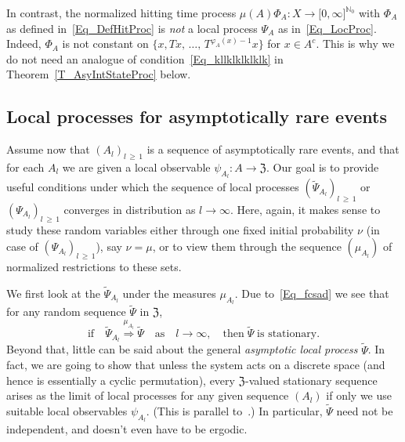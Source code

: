 \documentclass[AHL,Unicode,longabstracts]{cedram}
\newcommand{\frkZ}{\mathfrak{Z}}
\newcommand{\bbN}{\mathbb{N}}
\begin{document}
\begin{rema}
In contrast, the normalized hitting time process $\mu(A)\Phi_{A}:X\rightarrow\lbrack 0,\infty]^{\bbN_{0}}$ with $\Phi_{A}$ as defined in~\eqref{Eq_DefHitProc} is \emph{not} a local process $\Psi_{A}$ as in~\eqref{Eq_LocProc}. Indeed, $\Phi_{A}$ is not constant on $\{x,Tx,\,\ldots,\,T^{\varphi_{A}(x)-1}x\}$ for $x\in A^{c}$. This is why we do not need an analogue of condition~\eqref{Eq_kllklklklklk} in Theorem~\ref{T_AsyIntStateProc} below.
\end{rema}



\subsection{Local processes for asymptotically rare events}
Assume now that $(A_{l})_{l\,\geq\,1}$ is a sequence of asymptotically rare events, and that for each $A_{l}$ we are given a local observable $\psi_{A_{l}}:A\rightarrow
\frkZ$. Our goal is to provide useful conditions under which the sequence of local processes $(\widetilde{\Psi}_{A_{l}})_{l\,\geq\,1}$ or $(\Psi_{A_{l}})_{l\,\geq\,1}$ converges in distribution as $l\rightarrow\infty$. Here, again, it makes sense to study these random variables either through one fixed initial probability $\nu$ (in case of $(\Psi_{A_{l}})_{l\,\geq\,1}$), say $\nu=\mu$, or to view them through the sequence $(\mu_{A_{l}})$ of normalized restrictions to these sets.



We first look at the $\widetilde{\Psi}_{A_{l}}$ under the measures $\mu _{A_{l}}$. Due to~\eqref{Eq_fcsad} we see that for any random sequence $\widetilde{\Psi}$ in $\frkZ$,
\begin{equation}\label{Eq_uoljioljo1}
\text{if}\quad\widetilde{\Psi}_{A_{l}}\overset{\mu_{A_{l}}}{\Longrightarrow }\widetilde{\Psi}\quad\text{as}\quad l\rightarrow\infty,\quad\text{then}\;\widetilde{\Psi}\;\text{is stationary}. 
\end{equation}
Beyond that, little can be said about the general \emph{asymptotic local process} $\widetilde{\Psi}$. In fact, we are going to show that unless the system acts on a discrete space (and hence is essentially a cyclic permutation), every $\frkZ$-valued stationary sequence arises as the limit of local processes for any given sequence $(A_{l})$ if only we use suitable local observables $\psi_{A_{l}}$. (This is parallel to~\cite[Theorem~2.1]{Z11}.) In particular, $\widetilde{\Psi}$ need not be independent, and doesn't even have to be ergodic.
\end{document}
